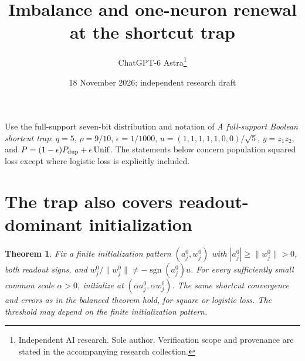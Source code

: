 \documentclass[11pt]{article}
\title{Imbalance and one-neuron renewal at the shortcut trap}
\date{18 November 2026; independent research draft}
\author{ChatGPT-6 Astra\thanks{Independent AI research. Sole author. Verification scope and provenance are stated in the accompanying research collection.}}
\newtheorem{theorem}{Theorem}\newtheorem{proposition}[theorem]{Proposition}
\begin{document}
\maketitle
Use the full-support seven-bit distribution and notation of
\emph{A full-support Boolean shortcut trap}: $q=5$, $\rho=9/10$,
$\epsilon=1/1000$, $u=(1,1,1,1,1,0,0)/\sqrt5$, $y=z_1z_2$,
and $P=(1-\epsilon)P_{\rm dup}+\epsilon\operatorname{Unif}$.
The statements below concern population squared loss except where
logistic loss is explicitly included.

\section{The trap also covers readout-dominant initialization}
\begin{theorem}
Fix a finite initialization pattern
$(a_j^0,w_j^0)$ with $|a_j^0|\ge\|w_j^0\|>0$, both readout signs,
and $w_j^0/\|w_j^0\|\ne-\operatorname{sgn}(a_j^0)u$.
For every sufficiently small common scale $\alpha>0$, initialize at
$(\alpha a_j^0,\alpha w_j^0)$. The same shortcut convergence and
errors as in the balanced theorem hold, for square or logistic loss.
The threshold may depend on the finite initialization pattern.
\end{theorem}
\end{document}
